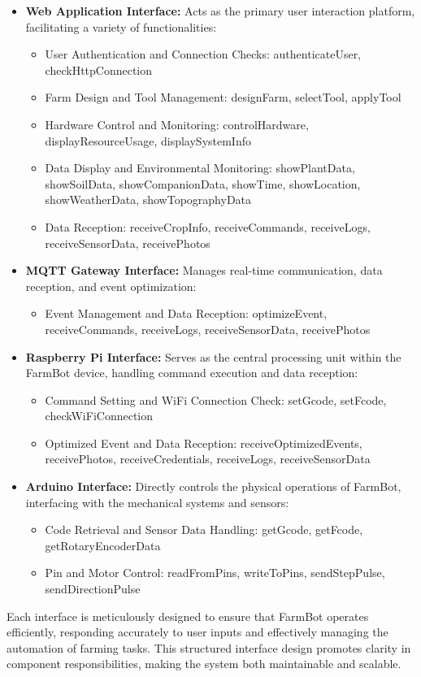 \begin{itemize}
    \item \textbf{Web Application Interface:} Acts as the primary user interaction platform, facilitating a variety of functionalities:
        \begin{itemize}
            \item User Authentication and Connection Checks: authenticateUser, checkHttpConnection
            \item Farm Design and Tool Management: designFarm, selectTool, applyTool
            \item Hardware Control and Monitoring: controlHardware, displayResourceUsage, displaySystemInfo
            \item Data Display and Environmental Monitoring: showPlantData, showSoilData, showCompanionData, showTime, showLocation, showWeatherData, showTopographyData
            \item Data Reception: receiveCropInfo, receiveCommands, receiveLogs, receiveSensorData, receivePhotos
        \end{itemize}
    \item \textbf{MQTT Gateway Interface:} Manages real-time communication, data reception, and event optimization:
        \begin{itemize}
            \item Event Management and Data Reception: optimizeEvent, receiveCommands, receiveLogs, receiveSensorData, receivePhotos
        \end{itemize}
    \item \textbf{Raspberry Pi Interface:} Serves as the central processing unit within the FarmBot device, handling command execution and data reception:
        \begin{itemize}
            \item Command Setting and WiFi Connection Check: setGcode, setFcode, checkWiFiConnection
            \item Optimized Event and Data Reception: receiveOptimizedEvents, receivePhotos, receiveCredentials, receiveLogs, receiveSensorData
        \end{itemize}
    \item \textbf{Arduino Interface:} Directly controls the physical operations of FarmBot, interfacing with the mechanical systems and sensors:
        \begin{itemize}
            \item Code Retrieval and Sensor Data Handling: getGcode, getFcode, getRotaryEncoderData
            \item Pin and Motor Control: readFromPins, writeToPins, sendStepPulse, sendDirectionPulse
        \end{itemize}
\end{itemize}
Each interface is meticulously designed to ensure that FarmBot operates efficiently, responding accurately to user inputs and effectively managing the automation of farming tasks. This structured interface design promotes clarity in component responsibilities, making the system both maintainable and scalable.

